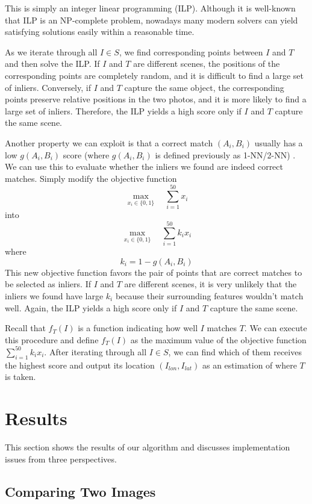 \documentclass[10pt,twocolumn,letterpaper]{article}
\begin{document}
This is simply an integer linear programming (ILP). Although it is well-known that ILP is an NP-complete problem, nowadays many modern solvers can yield satisfying solutions easily within a reasonable time. 

As we iterate through all $I\in S$, we find corresponding points between $I$ and $T$ and then solve the ILP. If $I$ and $T$ are different scenes, the positions of the corresponding points are completely random, and it is difficult to find a large set of inliers. Conversely, if $I$ and $T$ capture the same object, the corresponding points preserve relative positions in the two photos, and it is more likely to find a large set of inliers. Therefore, the ILP yields a high score only if $I$ and $T$ capture the same scene. 

Another property we can exploit is that a correct match $(A_i, B_i)$ usually has a low $g(A_i, B_i)$ score (where $g(A_i, B_i)$ is defined previously as  1-NN/2-NN) \cite{Lowe04}. We can use this to evaluate whether the inliers we found are indeed correct matches. Simply modify the objective function 
\[
    \max_{x_i\in\{0,1\}} \quad \sum_{i=1}^{50}x_i
\]
into 
\[
 \max_{x_i\in\{0,1\}} \quad \sum_{i=1}^{50}k_ix_i
\]
where 
\[
    k_i = 1 - g(A_i, B_i)
\]
This new objective function favors the pair of points that are correct matches to be selected as inliers. If $I$ and
$T$ are different scenes, it is very unlikely that the inliers we found have large $k_i$ because their surrounding features wouldn't match well. Again, the ILP yields a high score only if $I$ and $T$ capture the same scene.

Recall that $f_T(I)$ is a function indicating how well $I$ matches $T$. We can execute this procedure and define $f_T(I)$ as the maximum value of the objective function $\sum_{i=1}^{50}k_ix_i$. After iterating through all $I\in S$, we can find which of them receives the highest score and output its location $(I_{lon}, I_{lat})$ as an estimation of where $T$ is taken.

\section{Results}

This section shows the results of our algorithm and discusses implementation issues from three perspectives. 

\subsection{Comparing Two Images}
\end{document}
